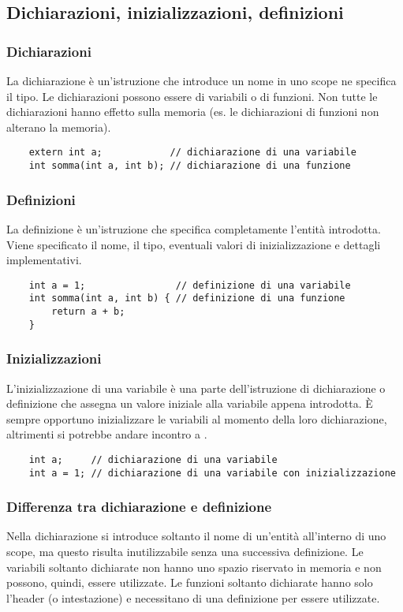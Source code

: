\documentclass[a4paper]{article}
\begin{document}
\subsection{Dichiarazioni, inizializzazioni, definizioni}
\subsubsection*{Dichiarazioni}
La dichiarazione è un'istruzione che introduce un nome in uno scope ne specifica il tipo. Le dichiarazioni possono essere di
variabili o di funzioni. Non tutte le dichiarazioni hanno effetto sulla memoria (es. le dichiarazioni di funzioni non alterano
la memoria).
\begin{lstlisting}
	extern int a;            // dichiarazione di una variabile
	int somma(int a, int b); // dichiarazione di una funzione
\end{lstlisting}

\subsubsection*{Definizioni}
La definizione è un'istruzione che specifica completamente l'entità introdotta. Viene specificato il nome, il tipo, eventuali
valori di inizializzazione e dettagli implementativi.
\begin{lstlisting}
	int a = 1;                // definizione di una variabile
	int somma(int a, int b) { // definizione di una funzione
		return a + b;
	}
\end{lstlisting}

\subsubsection*{Inizializzazioni}
L'inizializzazione di una variabile è una parte dell'istruzione di dichiarazione o definizione che assegna un valore iniziale
alla variabile appena introdotta. È sempre opportuno inizializzare le variabili al momento della loro dichiarazione, altrimenti
si potrebbe andare incontro a .
\begin{lstlisting}
	int a;     // dichiarazione di una variabile
	int a = 1; // dichiarazione di una variabile con inizializzazione
\end{lstlisting}

\subsubsection*{Differenza tra dichiarazione e definizione}
Nella dichiarazione si introduce soltanto il nome di un'entità all'interno di uno scope, ma questo risulta inutilizzabile senza
una successiva definizione. Le variabili soltanto dichiarate non hanno uno spazio riservato in memoria e non possono, quindi,
essere utilizzate. Le funzioni soltanto dichiarate hanno solo l'header (o intestazione) e necessitano di una definizione per 
essere utilizzate.
\end{document}
